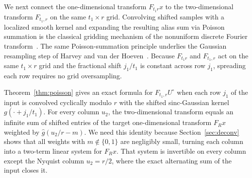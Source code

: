 We next connect the one-dimensional transform $F_{t_1 r} x$ to the two-dimensional transform $F_{t_1, r}$ on the same $t_1 \times r$ grid. Convolving shifted samples with a localized smooth kernel and expanding the resulting alias sum via Poisson summation is the classical gridding mechanism of the nonuniform discrete Fourier transform~\cite{DR93,PST01,GL04,BMK19}. The same Poisson-summation principle underlies the Gaussian resampling step of Harvey and van der Hoeven~\cite{HvdH21}. Because $F_{t_1 r}$ and $F_{t_1, r}$ act on the same $t_1 \times r$ grid and the fractional shift $j_1 / t_1$ is constant across row $j_1$, spreading each row requires no grid oversampling.

Theorem~\ref{thm:poisson} gives an exact formula for $F_{t_1, r} U^\circ$ when each row $j_1$ of the input is convolved cyclically modulo $r$ with the shifted sinc-Gaussian kernel $g(\cdot + j_1/t_1)$. For every column $u_2$, the two-dimensional transform equals an infinite sum of shifted entries of the target one-dimensional transform $F_R x$ weighted by $\hat{g}(u_2/r - m)$. We need this identity because Section~\ref{sec:deconv} shows that all weights with $m \notin \{0, 1\}$ are negligibly small, turning each column into a two-term linear system for $F_R x$. That system is invertible on every column except the Nyquist column $u_2 = r/2$, where the exact alternating sum of the input closes it.

